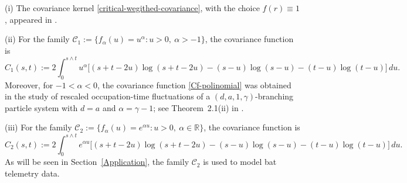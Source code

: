 \documentclass[preprint,12pt,authoryear]{elsarticle}
\begin{document}
\begin{rem}
(i) The covariance kernel \eqref{critical-wegithed-covariance}, with the choice $f(r)\equiv 1$, appeared in \cite{BGT2007,BGT2008}.

(ii) For the family $\mathcal{C}_1:=\{f_{\alpha}(u)=u^{\alpha}: u>0,\ \alpha>-1\}$, the covariance function is
\begin{equation}\label{Cf-polinomial}
C_1(s,t):=2\int_0^{s\wedge t} u^\alpha \Big[(s+t-2u)\log(s+t-2u)-(s-u)\log(s-u)-(t-u)\log(t-u)\Big]\,du.
\end{equation}
Moreover, for $-1<\alpha<0$, the covariance function \eqref{Cf-polinomial} was obtained in the study of rescaled occupation-time fluctuations of a $(d,a,1,\gamma)$-branching particle system with $d=a$ and $\alpha=\gamma-1$; see Theorem~2.1(ii) in \cite{LMR2024}.

(iii) For the family $\mathcal{C}_2:=\{f_{\alpha}(u)=e^{\alpha u}: u>0,\ \alpha\in\mathbb{R}\}$, the covariance function is
\begin{equation}\label{Cf-exponential}
C_2(s,t):=2\int_0^{s\wedge t} e^{\alpha u}\Big[(s+t-2u)\log(s+t-2u)-(s-u)\log(s-u)-(t-u)\log(t-u)\Big]\,du.
\end{equation}
As will be seen in Section~\ref{Application}, the family $\mathcal{C}_2$ is used to model bat telemetry data.
\end{rem}
\end{document}
